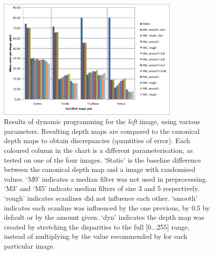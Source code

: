 \begin{figure}[h]
  \centering
  \includegraphics[width=0.8\textwidth]{Stereo-left-report}
  \caption[Results of dynamic programming (left image)]{Results of dynamic programming for the \emph{left} image, using various parameters. Resulting depth maps are compared to the canonical depth maps to obtain discrepancies (quantities of error). Each coloured column in the chart is a different parameterisation, as tested on one of the four images. `Static' is the baseline difference between the canonical depth map and a image with randomised values. `M0' indicates a median filter was not used in preprocessing. `M3' and `M5' indicate median filters of size 3 and 5 respectively. `rough' indicates scanlines did not influence each other. `smooth' indicates each scanline was influenced by the one previous, by 0.5 by default or by the amount given. `dyn' indicates the depth map was created by stretching the disparities to the full [0...255] range, instead of multiplying by the value recommended by \cite{middlebury} for each particular image.}
  \label{fig:stereo-left}
\end{figure}

